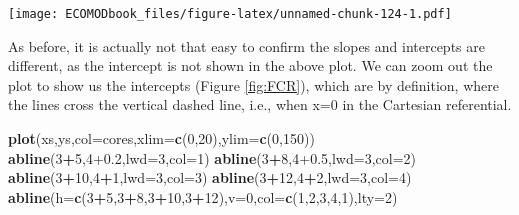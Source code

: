 \documentclass[
]{book}
\newenvironment{Shaded}{\begin{snugshade}}{\end{snugshade}}
\newcommand{\DataTypeTok}[1]{\textcolor[rgb]{0.13,0.29,0.53}{#1}}
\newcommand{\DecValTok}[1]{\textcolor[rgb]{0.00,0.00,0.81}{#1}}
\newcommand{\FloatTok}[1]{\textcolor[rgb]{0.00,0.00,0.81}{#1}}
\newcommand{\KeywordTok}[1]{\textcolor[rgb]{0.13,0.29,0.53}{\textbf{#1}}}
\newcommand{\NormalTok}[1]{#1}
\newcommand{\OperatorTok}[1]{\textcolor[rgb]{0.81,0.36,0.00}{\textbf{#1}}}
\begin{document}
\texttt{[image: ECOMODbook\_files/figure-latex/unnamed-chunk-124-1.pdf]}

As before, it is actually not that easy to confirm the slopes and intercepts are different, as the intercept is not shown in the above plot. We can zoom out the plot to show us the intercepts (Figure \ref{fig:FCR}), which are by definition, where the lines cross the vertical dashed line, i.e., when x=0 in the Cartesian referential.

\begin{Shaded}
\begin{Highlighting}[]
\KeywordTok{plot}\NormalTok{(xs,ys,}\DataTypeTok{col=}\NormalTok{cores,}\DataTypeTok{xlim=}\KeywordTok{c}\NormalTok{(}\DecValTok{0}\NormalTok{,}\DecValTok{20}\NormalTok{),}\DataTypeTok{ylim=}\KeywordTok{c}\NormalTok{(}\DecValTok{0}\NormalTok{,}\DecValTok{150}\NormalTok{))}
\KeywordTok{abline}\NormalTok{(}\DecValTok{3}\OperatorTok{+}\DecValTok{5}\NormalTok{,}\DecValTok{4}\FloatTok{+0.2}\NormalTok{,}\DataTypeTok{lwd=}\DecValTok{3}\NormalTok{,}\DataTypeTok{col=}\DecValTok{1}\NormalTok{)}
\KeywordTok{abline}\NormalTok{(}\DecValTok{3}\OperatorTok{+}\DecValTok{8}\NormalTok{,}\DecValTok{4}\FloatTok{+0.5}\NormalTok{,}\DataTypeTok{lwd=}\DecValTok{3}\NormalTok{,}\DataTypeTok{col=}\DecValTok{2}\NormalTok{)}
\KeywordTok{abline}\NormalTok{(}\DecValTok{3}\OperatorTok{+}\DecValTok{10}\NormalTok{,}\DecValTok{4}\OperatorTok{+}\DecValTok{1}\NormalTok{,}\DataTypeTok{lwd=}\DecValTok{3}\NormalTok{,}\DataTypeTok{col=}\DecValTok{3}\NormalTok{)}
\KeywordTok{abline}\NormalTok{(}\DecValTok{3}\OperatorTok{+}\DecValTok{12}\NormalTok{,}\DecValTok{4}\OperatorTok{+}\DecValTok{2}\NormalTok{,}\DataTypeTok{lwd=}\DecValTok{3}\NormalTok{,}\DataTypeTok{col=}\DecValTok{4}\NormalTok{)}
\KeywordTok{abline}\NormalTok{(}\DataTypeTok{h=}\KeywordTok{c}\NormalTok{(}\DecValTok{3}\OperatorTok{+}\DecValTok{5}\NormalTok{,}\DecValTok{3}\OperatorTok{+}\DecValTok{8}\NormalTok{,}\DecValTok{3}\OperatorTok{+}\DecValTok{10}\NormalTok{,}\DecValTok{3}\OperatorTok{+}\DecValTok{12}\NormalTok{),}\DataTypeTok{v=}\DecValTok{0}\NormalTok{,}\DataTypeTok{col=}\KeywordTok{c}\NormalTok{(}\DecValTok{1}\NormalTok{,}\DecValTok{2}\NormalTok{,}\DecValTok{3}\NormalTok{,}\DecValTok{4}\NormalTok{,}\DecValTok{1}\NormalTok{),}\DataTypeTok{lty=}\DecValTok{2}\NormalTok{)}
\end{Highlighting}
\end{Shaded}
\end{document}
